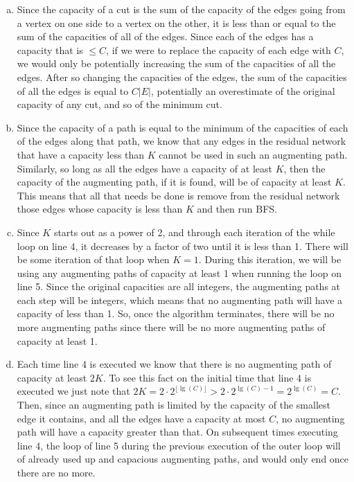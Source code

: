 \documentclass{article}
\begin{document}
\begin{enumerate}[a.]
\item Since the capacity of a cut is the sum of the capacity of the edges going from a vertex on one side to a vertex on the other, it is less than or equal to the sum of the capacities of all of the edges. Since each of the edges has a capacity that is $\le C$, if we were to replace the capacity of each edge with $C$, we would only be potentially increasing the sum of the capacities of all the edges. After so changing the capacities of the edges, the sum of the capacities of all the edges is equal to $C|E|$, potentially an overestimate of the original capacity of any cut, and so of the minimum cut.
\item
Since the capacity of a path is equal to the minimum of the capacities of each of the edges along that path, we know that any edges in the residual network that have a capacity less than $K$ cannot be used in such an augmenting path. Similarly, so long as all the edges have a capacity of at least $K$, then the capacity of the augmenting path, if it is found, will be of capacity at least $K$. This means that all that needs be done is remove from the residual network those edges whose capacity is less than $K$ and then run BFS.
\item
Since $K$ starts out as a power of 2, and through each iteration of the while loop on line 4, it decreases by a factor of two until it is less than 1. There will be some iteration of that loop when $K=1$. During this iteration, we will be using any augmenting paths of capacity at least 1 when running the loop on line 5. Since the original capacities are all integers, the augmenting paths at each step will be integers, which means that no augmenting path will have a capacity of less than 1. So, once the algorithm terminates, there will be no more augmenting paths since there will be no more augmenting paths of capacity at least 1.
\item
Each time line 4 is executed we know that there is no augmenting path of capacity at least $2K$. To see this fact on the initial time that line 4 is executed we just note that $2 K = 2\cdot 2^{\lfloor \lg(C)\rfloor} > 2\cdot2^{\lg(C) -1} = 2^{\lg(C)} = C$. Then, since an augmenting path is limited by the capacity of the smallest edge it contains, and all the edges have a capacity at most $C$, no augmenting path will have a capacity greater than that. On subsequent times executing line 4, the loop of line 5 during the previous execution of the outer loop will of already used up and capacious augmenting paths, and would only end once there are no more. 


\end{enumerate}
\end{document}
